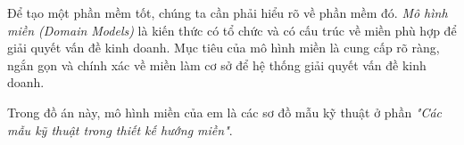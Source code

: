 Để tạo một phần mềm tốt, chúng ta cần phải hiểu rõ về phần mềm đó. \emph{Mô hình miền (Domain Models)} là kiến thức có tổ chức và có cấu trúc về miền phù hợp để giải quyết vấn đề kinh doanh. Mục tiêu của mô hình miền là cung cấp rõ ràng, ngắn gọn và chính xác về miền làm cơ sở để hệ thống giải quyết vấn đề kinh doanh.

\begin{example} Trong đồ án này, mô hình miền của em là  các sơ đồ   mẫu kỹ thuật ở phần \emph{"Các mẫu kỹ thuật trong thiết kế hướng miền"}. \end{example}